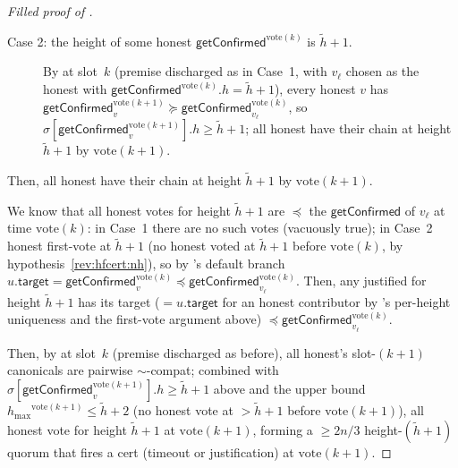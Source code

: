 \documentclass{article}
\newcommand{\target}{\mathsf{target}}
\newcommand{\hmax}{\ensuremath{h_{\max}}\xspace}
\newcommand{\vote}{\ensuremath{\mathrm{vote}}}
\newcommand{\comm}[1]{\ensuremath{\widetilde{#1}}}
\newcommand{\getConfirmed}{\textsf{getConfirmed}\xspace}
\theoremstyle{plain}
\theoremstyle{definition}
\theoremstyle{remark}
\begin{document}
\begin{proof}[Filled proof of ]
\begin{description}
  \item[Case 2: the height of some honest $\getConfirmed^{\vote(k)}$ is $\comm{h}+1$.]
  By  at slot~$k$ (premise discharged as in Case~1, with $v_\ell$ chosen as the honest with $\getConfirmed^{\vote(k)}.h = \comm{h}+1$), every honest $v$ has $\getConfirmed_v^{\vote(k+1)} \succeq \getConfirmed_{v_\ell}^{\vote(k)}$, so $\sigma[\getConfirmed_v^{\vote(k+1)}].h \geq \comm{h}+1$;
  all honest have their chain at height $\comm{h}+1$ by $\vote(k+1)$.
\end{description}

Then, all honest have their chain at height $\comm{h}+1$ by $\vote(k+1)$.

We know that all honest votes for height $\comm{h}+1$ are $\preceq$ the $\getConfirmed$ of $v_\ell$ at time $\vote(k)$:
in Case~1 there are no such votes (vacuously true);
in Case~2 honest first-vote at $\comm{h}+1$ (no honest voted at $\comm{h}+1$ before $\vote(k)$, by hypothesis~\ref{rev:hfcert:nh}), so by 's default branch $u.\target = \getConfirmed_v^{\vote(k)} \preceq \getConfirmed_{v_\ell}^{\vote(k)}$.
Then, any justified for height $\comm{h}+1$ has its target ($= u.\target$ for an honest contributor by 's per-height uniqueness and the first-vote argument above) $\preceq \getConfirmed_{v_\ell}^{\vote(k)}$.

Then, by  at slot~$k$ (premise discharged as before), all honest's slot-$(k+1)$ canonicals are pairwise $\sim$-compat;
combined with $\sigma[\getConfirmed_v^{\vote(k+1)}].h \geq \comm{h}+1$ above and the upper bound $\hmax^{\vote(k+1)} \leq \comm{h}+2$ (no honest vote at $> \comm{h}+1$ before $\vote(k+1)$), all honest vote for height $\comm{h}+1$ at $\vote(k+1)$, forming a $\geq 2n/3$ height-$(\comm{h}+1)$ quorum that fires a cert (timeout or justification) at $\vote(k+1)$.


\end{proof}
\end{document}
